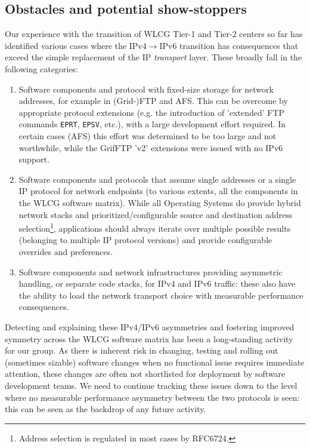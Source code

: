 \subsection{Obstacles and potential show-stoppers}
Our experience with the transition of WLCG Tier-1 and Tier-2 centers so far 
has identified various cases where the IPv4$\rightarrow$IPv6 transition has
consequences that exceed the simple replacement of the IP {\it transport} layer.
These broadly fall in the following categories:
\begin{enumerate}
\item Software components and protocol with fixed-size storage for network
addresses, for example in (Grid-)FTP and AFS. This can be overcome by appropriate
protocol extensions (e.g. the introduction of 'extended' FTP commands
{\tt EPRT}, {\tt EPSV}, etc.), with a large development effort required.
In certain cases (AFS) this effort was determined to be too large and not
worthwhile, while the GrifFTP 'v2' extensions were issued with no IPv6 support.
\item Software components and protocols that assume single addresses or a single
IP protocol for 
network endpoints (to various extents, all the components in the WLCG software
matrix). While all Operating Systems do provide hybrid network stacks and prioritized/configurable
source and destination address selection\footnote{Address selection is regulated in most cases by RFC6724.}, applications should always iterate over multiple
possible results (belonging to multiple IP protocol versions) and provide configurable
overrides and preferences. 
\item Software components and network infrastructures providing asymmetric
handling, or separate code stacks, for IPv4 and IPv6 traffic: these also
have the ability to load the network transport choice with measurable
performance consequences.
\end{enumerate}
Detecting and explaining these IPv4/IPv6 asymmetries and fostering improved
symmetry across the WLCG software matrix has been a long-standing activity
for our group. As there is inherent risk in changing, testing and rolling
out (sometimes sizable) software changes when no functional
issue requires immediate attention, these changes are often not shortlisted
for deployment by software development teams. We need to continue tracking
these issues down to the
level where no %
measurable performance asymmetry between the two
protocols is seen: this can be seen as the backdrop of any future activity.

